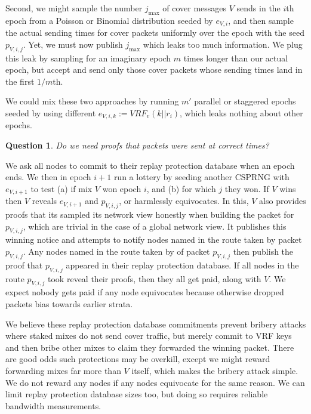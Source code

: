 ﻿\documentclass{sig-alternate-hotpets}
\newtheorem{question}{Question}
\begin{document}
Second, we might sample the number $j_{\max}$ of cover messages $V$
sends in the $i$th epoch from a Poisson or Binomial distribution seeded
by $e_{V,i}$, and then sample the actual sending times for cover packets
uniformly over the epoch with the seed $p_{V,i,j}$.  Yet, we must now
publish $j_{\max}$ which leaks too much information.  We plug this leak
by sampling for an imaginary epoch $m$ times longer than our actual
epoch, but accept and send only those cover packets whose sending times
land in the first $1/m$th.  

We could mix these two approaches by running $m'$ parallel or staggered
epochs seeded by using different $e_{V,i,k} := VRF_v(k || r_i)$, which
leaks nothing about other epochs.  

\begin{question}
Do we need proofs that packets were sent at correct times?
\end{question}

We ask all nodes to commit to their replay protection database when an epoch ends.  We then in epoch $i+1$ run a lottery by seeding another CSPRNG with $e_{V,i+1}$ to test (a) if mix $V$ won epoch $i$, and (b) for which $j$ they won.  If $V$ wins then $V$ reveals $e_{V,i+1}$ and $p_{V,i,j}$, or harmlessly equivocates.  In this, $V$ also provides proofs that its sampled its network view honestly when building the packet for $p_{V,i,j}$, which are trivial in the case of a global network view.  It publishes this winning notice and attempts to notify nodes named in the route taken by packet $p_{V,i,j}$.  Any nodes named in the route taken by of packet $p_{V,i,j}$ then publish the proof that $p_{V,i,j}$ appeared in their replay protection database.  If all nodes in the route $p_{V,i,j}$ took reveal their proofs, then they all get paid, along with $V$.  We expect nobody gets paid if any node equivocates because otherwise dropped packets bias towards earlier strata.

We believe these replay protection database commitments prevent bribery attacks where staked mixes do not send cover traffic, but merely commit to VRF keys and then bribe other mixes to claim they forwarded the winning packet.  There are good odds such protections may be overkill, except we might reward forwarding mixes far more than $V$ itself, which makes the bribery attack simple.  We do not reward any nodes if any nodes equivocate for the same reason.  We can limit replay protection database sizes too, but doing so requires reliable bandwidth measurements.
\end{document}
